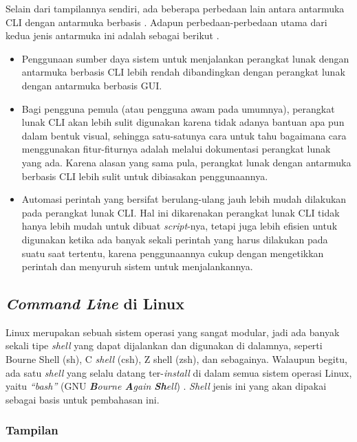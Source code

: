 Selain dari tampilannya sendiri, ada beberapa perbedaan lain antara antarmuka CLI dengan antarmuka berbasis \gui. Adapun perbedaan-perbedaan utama dari kedua jenis antarmuka ini adalah sebagai berikut \cite{mueller:2007:windowscommandline}.
\begin{itemize}
	\item Penggunaan sumber daya sistem untuk menjalankan perangkat lunak dengan antarmuka berbasis CLI lebih rendah dibandingkan dengan perangkat lunak dengan antarmuka berbasis GUI.
	\item Bagi pengguna pemula (atau pengguna awam pada umumnya), perangkat lunak CLI akan lebih sulit digunakan karena tidak adanya bantuan apa pun dalam bentuk visual, sehingga satu-satunya cara untuk tahu bagaimana cara menggunakan fitur-fiturnya adalah melalui dokumentasi perangkat lunak yang ada. Karena alasan yang sama pula, perangkat lunak dengan antarmuka berbasis CLI lebih sulit untuk dibiasakan penggunaannya.
	\newpage
	\item Automasi perintah yang bersifat berulang-ulang jauh lebih mudah dilakukan pada perangkat lunak CLI. Hal ini dikarenakan perangkat lunak CLI tidak hanya lebih mudah untuk dibuat \textit{script}-nya, tetapi juga lebih efisien untuk digunakan ketika ada banyak sekali perintah yang harus dilakukan pada suatu saat tertentu, karena penggunaannya cukup dengan mengetikkan perintah dan menyuruh sistem untuk menjalankannya.
\end{itemize}

\subsection{\textit{Command Line} di Linux}
\label{sec:commandline-linux}

Linux merupakan sebuah sistem operasi yang sangat modular, jadi ada banyak sekali tipe \textit{shell} yang dapat dijalankan dan digunakan di dalamnya, seperti Bourne Shell (sh), C \textit{shell} (csh), Z shell (zsh), dan sebagainya. Walaupun begitu, ada satu \textit{shell} yang selalu datang ter-\textit{install} di dalam semua sistem operasi Linux, yaitu \textit{``bash''} (GNU \textit{\textbf{B}ourne \textbf{A}gain \textbf{Sh}ell}) \cite{matthew:2007:beginninglinuxprogramming}. \textit{Shell} jenis ini yang akan dipakai sebagai basis untuk pembahasan ini.

\subsubsection{Tampilan}
\label{sec:commandline-linux-appearance}

